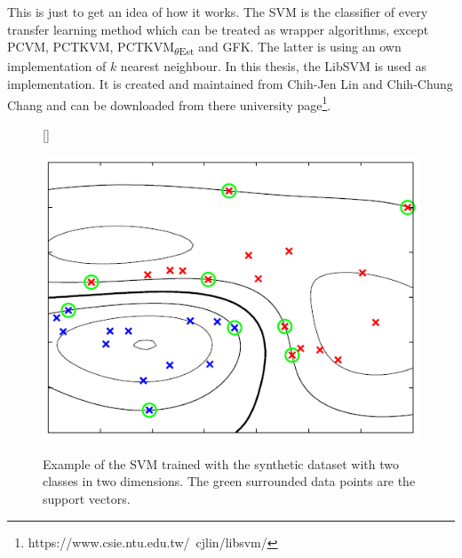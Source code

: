 This is just to get an idea of how it works.
The \acs{SVM} is the classifier of every transfer learning method which can be treated as wrapper algorithms, except \acs{PCVM}, \acs{PCTKVM}, \acs{PCTKVM}\textsubscript{$\theta$Est} and \acs{GFK}.
The latter is using an own implementation of $k$ nearest neighbour.
In this thesis, the LibSVM is used as implementation.
It is created and maintained from Chih-Jen Lin and Chih-Chung Chang and can be downloaded from there university page\footnote{https://www.csie.ntu.edu.tw/~cjlin/libsvm/}.
\begin{figure}
	\centering
	[\FBwidth]
	{\caption[Example of SVM Clasification]{Example of the SVM trained with the synthetic dataset with two classes in two dimensions. The green surrounded data points are the support vectors. \cite[p. 331]{Bishop.2009}}}
	{\includegraphics[width=\linewidth]{figures/SVMProd.png}\label{FigSVMProd}}
\end{figure}

